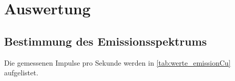 \section{Auswertung}
\label{sec:Auswertung}



\subsection{Bestimmung des Emissionsspektrums}
\label{ssec:1}

Die gemessenen Impulse pro Sekunde werden in \autoref{tab:werte_emissionCu} aufgelistet.

